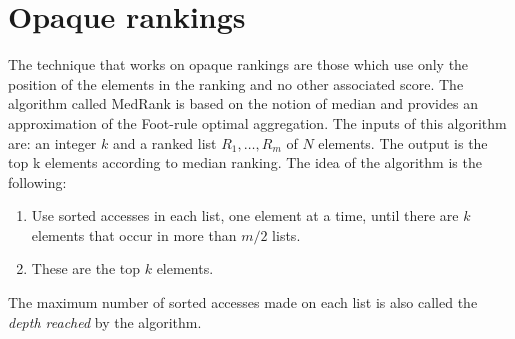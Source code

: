 \documentclass[12pt, a4paper]{report}
\newtheorem[style=M,bodystyle=\normalfont]{theorem}{Theorem}
\newtheorem[style=M,bodystyle=\normalfont]{corollary}{Corollary}
\newtheorem[style=M,bodystyle=\normalfont]{lemma}{Lemma}
\newtheorem[style=M,bodystyle=\normalfont]{definition}{Definition}
\begin{document}
    \section{Opaque rankings}
    The technique that works on opaque rankings are those which use only the position of the elements in the ranking and no other associated score. The algorithm called MedRank is
    based on the notion of median and provides an approximation of the Foot-rule optimal aggregation. The inputs of this algorithm are: an integer $k$ and a ranked list 
    $R_1,\dots,R_m$ of $N$ elements. The output is the top k elements according to median ranking. The idea of the algorithm is the following: 
    \begin{enumerate}
        \item Use sorted accesses in each list, one element at a time, until there are $k$ elements that occur in more than $m/2$ lists.
        \item These are the top $k$ elements. 
    \end{enumerate}
    \begin{definition}
        The maximum number of sorted accesses made on each list is also called the \emph{depth reached} by the algorithm. 
    \end{definition}
\end{document}

